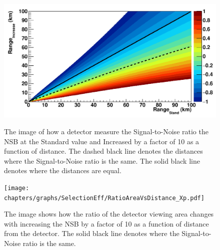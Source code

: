 \begin{figure}
\centering
\includegraphics[width=\textwidth]{chapters/graphs/SelectionEff/RangeIncreaseVsRangeStand_Xp.pdf}
\caption{The image of how a detector measure the Signal-to-Noise ratio the NSB at the Standard value and Increased by a factor of 10 as a function of distance. The dashed black line denotes the distances where the Signal-to-Noise ratio is the same. The solid black line denotes where the distances are equal.}
\texttt{[image: chapters/graphs/SelectionEff/RatioAreaVsDistance\_Xp.pdf]}
\caption{The image shows how the ratio of the detector viewing area changes with increasing the NSB by a factor of 10 as a function of distance from the detector. The solid black line denotes where the Signal-to-Noise ratio is the same.}
\end{figure}

